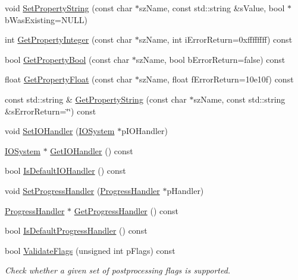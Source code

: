 \begin{DoxyCompactItemize}
\item 
void \hyperlink{classAssimp_1_1Importer_a8f79ecb5c6f67a76fc87654c32986e8e}{\-Set\-Property\-String} (const char $\ast$sz\-Name, const std\-::string \&s\-Value, bool $\ast$b\-Was\-Existing=\-N\-U\-L\-L)
\item 
int \hyperlink{classAssimp_1_1Importer_a3e796a0758a9f10f13107f44c542ad41}{\-Get\-Property\-Integer} (const char $\ast$sz\-Name, int i\-Error\-Return=0xffffffff) const 
\item 
bool \hyperlink{classAssimp_1_1Importer_a90f5d35d25e5d2a0ef8bc0c6545b2010}{\-Get\-Property\-Bool} (const char $\ast$sz\-Name, bool b\-Error\-Return=false) const 
\item 
float \hyperlink{classAssimp_1_1Importer_a9a99a3467d6386ddcfbe2823f16b6640}{\-Get\-Property\-Float} (const char $\ast$sz\-Name, float f\-Error\-Return=10e10f) const 
\item 
const std\-::string \& \hyperlink{classAssimp_1_1Importer_a4d64ee7131d6c26dc9688de85d142f14}{\-Get\-Property\-String} (const char $\ast$sz\-Name, const std\-::string \&s\-Error\-Return=\char`\"{}\char`\"{}) const 
\item 
void \hyperlink{classAssimp_1_1Importer_a1161f46318af18bb86dfe0fc3edea4df}{\-Set\-I\-O\-Handler} (\hyperlink{classAssimp_1_1IOSystem}{\-I\-O\-System} $\ast$p\-I\-O\-Handler)
\item 
\hyperlink{classAssimp_1_1IOSystem}{\-I\-O\-System} $\ast$ \hyperlink{classAssimp_1_1Importer_abe3af30f4c5eae2e875b0f32068be44d}{\-Get\-I\-O\-Handler} () const 
\item 
bool \hyperlink{classAssimp_1_1Importer_ae3f26466cf7756594216ffedbc247563}{\-Is\-Default\-I\-O\-Handler} () const 
\item 
void \hyperlink{classAssimp_1_1Importer_a6a4d830ffb3f77a3c7c919e0af006920}{\-Set\-Progress\-Handler} (\hyperlink{classAssimp_1_1ProgressHandler}{\-Progress\-Handler} $\ast$p\-Handler)
\item 
\hyperlink{classAssimp_1_1ProgressHandler}{\-Progress\-Handler} $\ast$ \hyperlink{classAssimp_1_1Importer_a1fa669f0edc504fdf9178e8e22c728ad}{\-Get\-Progress\-Handler} () const 
\item 
bool \hyperlink{classAssimp_1_1Importer_a2d60d970eddf8f9d35b6e9b54214cedd}{\-Is\-Default\-Progress\-Handler} () const 
\item 
bool \hyperlink{classAssimp_1_1Importer_a780329e2dd0406e930291cf8ab9deb99}{\-Validate\-Flags} (unsigned int p\-Flags) const 
\begin{DoxyCompactList}\small\item\em \-Check whether a given set of postprocessing flags is supported. \end{DoxyCompactList}\item 

\end{DoxyCompactItemize}

